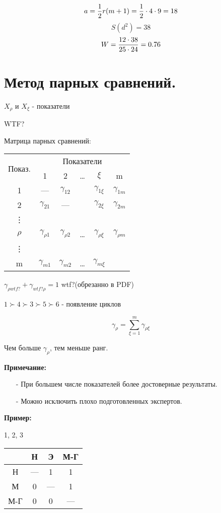 \documentclass[12pt,a5paper]{scrbook}
\begin{document}
  $$a={1 \over 2}r(m+1) = {1 \over 2}\cdot 4 \cdot 9 = 18$$
  $$S(d^2)=38$$
  $$W={12 \cdot 38 \over 25 \cdot 24} = 0.76$$
  
  \section{Метод парных сравнений.} %

  $X_{\rho}$ и $X_{\xi}$ - показатели

  WTF?

  Матрица парных сравнений:

  \begin{tabular}{|c|c|c|c|c|c|}
    \hline
    \multirow{2}{*}{Показ.} & \multicolumn{5}{c|}{Показатели}\\
    \cline{2-6}
    & 1 & 2 & \dots & $\xi$ & m\\
    \hline
    1 & --- & $\gamma_{12}$ & & $\gamma_{1\xi}$ & $\gamma_{1m}$\\
    \hline
    2 & $\gamma_{21}$ & --- & & $\gamma_{2\xi}$ & $\gamma_{2m}$\\
    \hline
    \vdots & & & & &\\
    \hline
    $\rho$ & $\gamma_{\rho 1}$ & $\gamma_{\rho 2}$ & \dots & $\gamma_{\rho\xi}$ & $\gamma_{\rho m}$\\
    \hline
    \vdots & & & & &\\
    \hline
    m & $\gamma_{m1}$ & $\gamma_{m2}$ & \dots & $\gamma_{m\xi}$ &\\
    \hline
  \end{tabular}

  $\gamma_{\rho wtf?} + \gamma_{wtf?\rho} = 1$ wtf?(обрезанно в PDF)

  $1 \succ 4 \succ 3 \succ 5 \succ 6$ - появление циклов

  $$\gamma_\rho = \sum_{\xi=1}^m\gamma_{\rho\xi}$$

  Чем больше $\gamma_\rho$, тем меньше ранг.

  \textbf{Примечание:}
  \begin{itemize}
    \item[-] При большем числе показателей более достоверные результаты.
    \item[-] Можно исключить плохо подготовленных экспертов.
  \end{itemize}

  \textbf{Пример:}

  1, 2, 3

  \begin{tabular}{c|c|c|c}
    & Н & Э & М-Г\\
    \hline
    Н & --- & 1 & 1\\
    М & 0 & --- & 1\\
    М-Г & 0 & 0 & ---
  \end{tabular}\\
\end{document}
